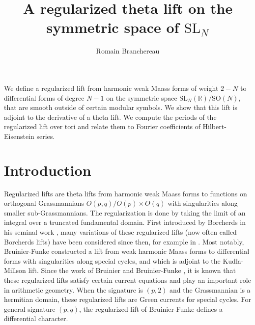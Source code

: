 \documentclass[twoside,a4paper,10pt]{article} %
\newcommand{\8}{\infty}
\newcommand{\SO}{\mathrm{SO}}
\newcommand{\SL}{\mathrm{SL}}
\newcommand{\R}{\mathbb{R}}
\theoremstyle{mytheoremstyle}
\theoremstyle{remark}
\numberwithin{equation}{section}
\renewenvironment{abstract}
 {\small
  \begin{center}
  \bfseries \abstractname\vspace{-.5em}\vspace{0pt}
  \end{center}
  \list{}{
    \setlength{\leftmargin}{3cm}%
    \setlength{\rightmargin}{\leftmargin}%
  }%
  \item\relax}
 {\endlist}
\begin{document}
\title{A regularized theta lift on the symmetric space of $\SL_N$}
\author{ Romain Branchereau }
\date{} %
\maketitle

\begin{abstract} We define a regularized lift from harmonic weak Maass forms of weight $2-N$ to differential forms of degree $N-1$ on the symmetric space $\SL_N(\R)/\SO(N)$, that are smooth outside of certain modular symbols. We show that this lift is adjoint to the derivative of a theta lift. We compute the periods of the regularized lift over tori and relate them to Fourier coefficients of Hilbert-Eisenstein series. 
\end{abstract}

{
  \tableofcontents
}

\section{Introduction}

Regularized lifts are theta lifts from harmonic weak Maass forms to functions on orthogonal Grassmannians $O(p,q)/O(p)\times O(q)$ with singularities along smaller sub-Grassmannians. The regularization is done by taking the limit of an integral over a truncated fundamental domain. First introduced by Borcherds in his seminal work \cite{borcherds1,borcherds2}, many variations of these regularized lifts (now often called Borcherds lifts) have been considered since then, for example in \cite{Bruinier12,Garcia16,AS20,FH21,CF23}.  Most notably, Bruinier-Funke \cite{BF04} constructed a lift from weak harmonic Maass forms to differential forms with singularities along special cycles, and which is adjoint to the Kudla-Millson lift. Since the work of Bruinier \cite{bruinierborch,B99} and Bruinier-Funke \cite{BF04}, it is known that these regularized lifts satisfy certain current equations and play an important role in arithmetic geometry. When the signature is $(p,2)$ and the Grassmannian is a hermitian domain, these regularized lifts are Green currents for special cycles. For general signature $(p,q)$, the regularized lift of Bruinier-Funke defines a differential character.
\end{document}
